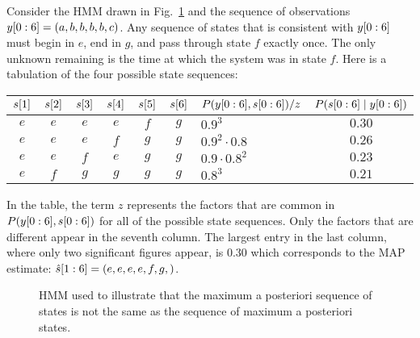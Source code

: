 Consider the HMM drawn in Fig.~\ref{fig:sequenceMAP} and the sequence
of observations $y[0:6] = (a,b,b,b,b,c)$.  Any sequence of
states that is consistent with $y[0:6]$ must begin in $e$, end
in $g$, and pass through state $f$ exactly once.  The only unknown
remaining is the time at which the system was in state $f$.  Here is a
tabulation of the four possible state sequences:
\begin{center}
  \begin{tabular}{|cccccc|l|c|}
    \hline
    ${s}{[1]}$ &  ${s}{[2]}$ &  ${s}{[3]}$ & 
    ${s}{[4]}$ &  ${s}{[5]}$ &  ${s}{[6]}$ &
    $P(y[0:6],s[0:6])/z$ & 
    $P(s[0:6]\mid y[0:6])$ \\
    \hline
    $e$ & $e$ & $e$ & $e$ & $f$ & $g$ & $0.9^3$           & $ 0.30$ \\
    $e$ & $e$ & $e$ & $f$ & $g$ & $g$ & $0.9^2\cdot 0.8$  & $ 0.26$ \\
    $e$ & $e$ & $f$ & $e$ & $g$ & $g$ & $0.9 \cdot 0.8^2$ & $ 0.23$ \\
    $e$ & $f$ & $g$ & $g$ & $g$ & $g$ & $0.8^3$           & $ 0.21$ \\\hline
  \end{tabular}
\end{center}
In the table, the term $z$ represents the factors that are common in
$P(y[0:6],s[0:6])$ for all of the possible state
sequences.  Only the factors that are different appear in the seventh
column.  The largest entry in the last column, where only two
significant figures appear, is 0.30 which corresponds to the MAP
estimate: $\hat s[1:6] = (e,e,e,e,f,g,)$.
\begin{figure}[htbp]
  \centering{\plotsize%
     
  }  
  \caption{HMM used to illustrate that the maximum a posteriori sequence of states is
    not the same as the sequence of maximum a posteriori states.}
\label{fig:sequenceMAP}
\end{figure}

